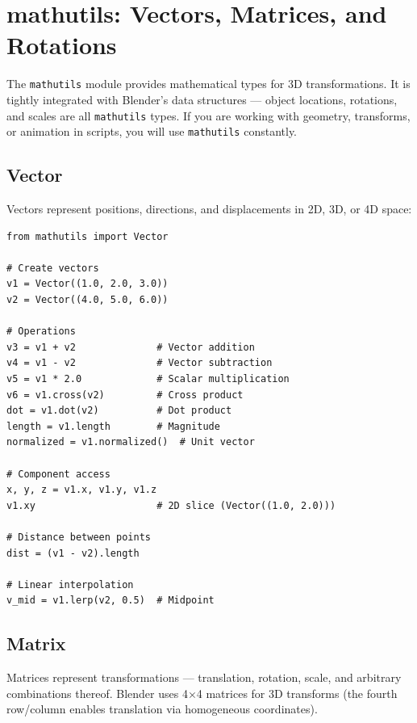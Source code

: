 \section{mathutils: Vectors, Matrices, and Rotations}
\label{sec:scripting-mathutils}

The \texttt{mathutils} module provides mathematical types for 3D transformations. It is tightly integrated with Blender's data structures --- object locations, rotations, and scales are all \texttt{mathutils} types. If you are working with geometry, transforms, or animation in scripts, you will use \texttt{mathutils} constantly.

\subsection{Vector}

Vectors represent positions, directions, and displacements in 2D, 3D, or 4D space:

\begin{lstlisting}
from mathutils import Vector

# Create vectors
v1 = Vector((1.0, 2.0, 3.0))
v2 = Vector((4.0, 5.0, 6.0))

# Operations
v3 = v1 + v2              # Vector addition
v4 = v1 - v2              # Vector subtraction
v5 = v1 * 2.0             # Scalar multiplication
v6 = v1.cross(v2)         # Cross product
dot = v1.dot(v2)          # Dot product
length = v1.length        # Magnitude
normalized = v1.normalized()  # Unit vector

# Component access
x, y, z = v1.x, v1.y, v1.z
v1.xy                     # 2D slice (Vector((1.0, 2.0)))

# Distance between points
dist = (v1 - v2).length

# Linear interpolation
v_mid = v1.lerp(v2, 0.5)  # Midpoint
\end{lstlisting}

\subsection{Matrix}

Matrices represent transformations --- translation, rotation, scale, and arbitrary combinations thereof. Blender uses 4$\times$4 matrices for 3D transforms (the fourth row/column enables translation via homogeneous coordinates).


